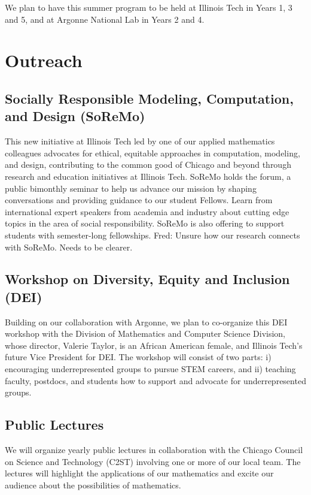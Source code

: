 \documentclass[11pt]{NSFamsart}
\newcommand{\FredNote}[1]{{\color{blue} Fred: #1}}
\begin{document}
We plan to have this summer program to be held at Illinois Tech in Years 1, 3 and 5, and at Argonne National Lab in Years 2 and 4. 



\section{Outreach}

\subsection*{Socially Responsible Modeling, Computation, and Design
(SoReMo)}
This new initiative at Illinois Tech led by one of our applied mathematics colleagues advocates for ethical, equitable approaches in computation,
modeling, and design, contributing to the common good of Chicago and
beyond through research and education initiatives at Illinois Tech.
SoReMo holds the forum,  a public bimonthly seminar to help us advance
our mission by shaping conversations and providing guidance to our
student Fellows. Learn from international expert speakers from academia
and industry about cutting edge topics in the area of social responsibility.
SoReMo is also offering to support students with semester-long fellowships.   
\FredNote{Unsure how our research connects with SoReMo.  Needs to be clearer.}

\subsection*{Workshop on Diversity, Equity and Inclusion (DEI)}
Building on our collaboration with Argonne, we plan to co-organize this DEI workshop with the Division of Mathematics and Computer Science Division, whose director, Valerie Taylor, is an African American female, and Illinois Tech's future Vice President for DEI.  The workshop will consist of two parts: i) encouraging underrepresented groups to pursue STEM careers, and ii) teaching faculty, postdocs, and students how to support and advocate for underrepresented groups.

\subsection*{Public Lectures} We will organize yearly public lectures in collaboration with the Chicago Council on Science and Technology (C2ST) involving one or more of our local team.  The lectures will highlight the applications of our mathematics and excite our audience about the possibilities of mathematics.  
\end{document}
